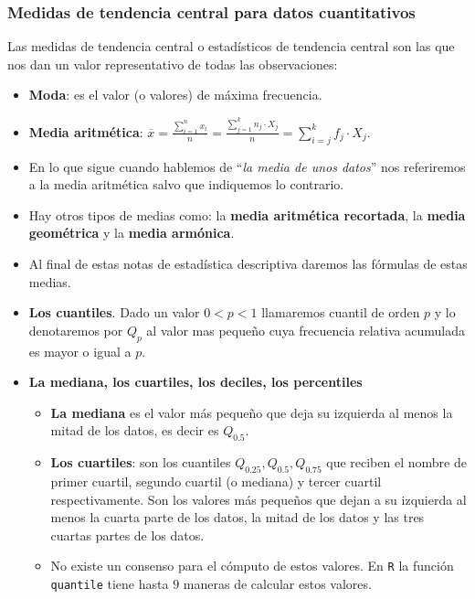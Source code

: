 \begin{frame}
\frametitle{Medidas de tendencia central para datos cuantitativos}
Las medidas de tendencia central o estadísticos de tendencia central son las que nos dan un valor representativo de todas las observaciones:
\begin{itemize}
\item \textbf{Moda}: es el valor (o valores) de máxima frecuencia.
\item \textbf{Media aritmética}: $\overline{x}=\frac{\sum_{i=1}^n x_i}{n}=\frac{\sum_{j=1}^k n_j\cdot X_j}{n}=
\sum_{i=j}^k f_j\cdot X_j$.
\item  En lo que sigue cuando hablemos de ``\textsl{la media de unos datos}''  nos referiremos  a la media aritmética salvo que indiquemos lo contrario.
\item Hay otros tipos de medias como: la  \textbf{media aritmética recortada}, la \textbf{ media geométrica} y  la \textbf{media armónica}.
\item Al final de estas notas de estadística descriptiva daremos las fórmulas de estas medias.
\end{itemize}
\end{frame}

\begin{frame}
\begin{itemize}
\item \textbf{Los cuantiles}. Dado un valor $0<p<1$ llamaremos cuantil de orden $p$ y lo denotaremos por $Q_p$ al valor mas pequeño cuya frecuencia relativa acumulada es mayor o igual a $p$.
\item \textbf{La mediana, los cuartiles, los deciles, los percentiles}
\begin{itemize}
\item \textbf{La mediana} es el valor más pequeño que deja su izquierda al menos la mitad de los datos, es decir es $Q_{0.5}$.
\item \textbf{Los cuartiles}: son los cuantiles $Q_{0.25},Q_{0.5},Q_{0.75}$ que reciben el nombre de primer cuartil, segundo cuartil (o mediana) y tercer cuartil respectivamente. Son los valores más pequeños que dejan a su izquierda al menos la cuarta parte de los datos, la mitad de los datos y las tres cuartas partes de los datos.
\item No existe un consenso para el cómputo  de estos valores. En \texttt{R} la función \texttt{quantile} tiene hasta $9$ maneras de calcular estos valores.
\end{itemize}
\end{itemize}
\end{frame}


